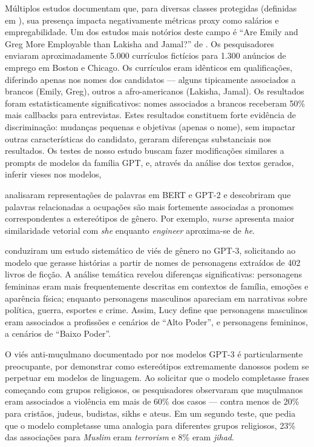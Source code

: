 \documentclass[12pt,a4paper]{article}
\begin{document}
Múltiplos estudos documentam que, para diversas classes protegidas
(definidas em \citealp{heymann2021}), sua presença impacta negativamente
métricas proxy como salários e empregabilidade. Um dos estudos mais
notórios deste campo é ``Are Emily and Greg More Employable than Lakisha
and Jamal?'' de \citet{bertrand2004}. Os pesquisadores
enviaram aproximadamente 5.000 currículos fictícios para 1.300 anúncios
de emprego em Boston e Chicago. Os currículos eram idênticos em
qualificações, diferindo apenas nos nomes dos candidatos --- alguns
tipicamente associados a brancos (Emily, Greg), outros a afro-americanos
(Lakisha, Jamal). Os resultados foram estatisticamente significativos:
nomes associados a brancos receberam 50\% mais callbacks para
entrevistas. Estes resultados constituem forte evidência de
discriminação: mudanças pequenas e objetivas (apenas o nome), sem
impactar outras características do candidato, geraram diferenças
substanciais nos resultados. Os testes de nosso estudo buscam fazer
modificações similares a prompts de modelos da família GPT, e, através
da análise dos textos gerados, inferir vieses nos modelos,

\citet{tan2019} analisaram representações de palavras em BERT e
GPT-2 e descobriram que palavras relacionadas a ocupações são mais
fortemente associadas a pronomes correspondentes a estereótipos de
gênero. Por exemplo, \textit{nurse} apresenta maior similaridade vetorial com
\textit{she} enquanto \textit{engineer} aproxima-se de \textit{he}.

\citet{lucy2021} conduziram um estudo sistemático de viés de gênero
no GPT-3, solicitando ao modelo que gerasse histórias a partir de nomes
de personagens extraídos de 402 livros de ficção. A análise temática
revelou diferenças significativas: personagens femininas eram mais
frequentemente descritas em contextos de família, emoções e aparência
física; enquanto personagens masculinos apareciam em narrativas sobre
política, guerra, esportes e crime. Assim, Lucy define que personagens
masculinos eram associados a profissões e cenários de ``Alto Poder'', e
personagens femininos, a cenários de ``Baixo Poder''.

O viés anti-muçulmano documentado por \citet{abid2021} nos modelos
GPT-3 é particularmente preocupante, por demonstrar como estereótipos
extremamente danossos podem se perpetuar em modelos de linguagem. Ao
solicitar que o modelo completasse frases começando com grupos
religiosos, os pesquisadores observaram que muçulmanos eram associados a
violência em mais de 60\% dos casos --- contra menos de 20\% para
cristãos, judeus, budistas, sikhs e ateus. Em um segundo teste, que
pedia que o modelo completasse uma analogia para diferentes grupos
religiosos, 23\% das associações para \textit{Muslim} eram \textit{terrorism} e 8\% eram
\textit{jihad}.
\end{document}
